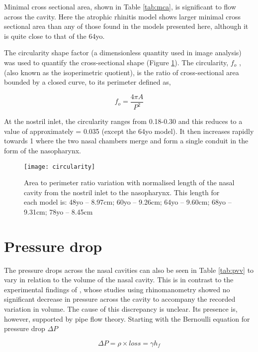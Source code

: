 Minimal cross sectional area, shown in Table \ref{tab:mca}, is significant to flow across the cavity\cite{Lindemann2008}. Here the atrophic rhinitis model shows larger minimal cross sectional area than any of those found in the models presented here, although it is quite close to that of the 64yo.

The circularity shape factor (a dimensionless quantity used in image analysis) was used to quantify the cross-sectional shape (Figure \ref{fig:Circ}). The circularity, $f_o$ , (also known as the isoperimetric quotient), is the ratio of cross-sectional area bounded by a closed curve, to its perimeter defined as, 

\begin{equation}
f_o = \frac{4 \pi A}{P^2}
\end{equation}

At the nostril inlet, the circularity ranges from 0.18-0.30 and this reduces to a value of approximately = 0.035 (except the 64yo model). It then increases rapidly towards 1 where the two nasal chambers merge and form a single conduit in the form of the nasopharynx.







\begin{figure}
\centering
\texttt{[image: circularity]}
\caption{Area to perimeter ratio variation with normalised length of the nasal cavity from the nostril inlet to the nasopharynx. This length for each model is: 48yo – 8.97cm; 60yo – 9.26cm; 64yo – 9.60cm; 68yo – 9.31cm; 78yo – 8.45cm}
\label{fig:Circ}
\end{figure}

\section{Pressure drop}

The pressure drops across the nasal cavities can also be seen in Table \ref{tab:pvv} to vary in relation to the volume of the nasal cavity. This is in contrast to the experimental findings of \cite{Lindemann2008, Edelstein1996, WhanKim2007}, whose studies using rhinomanometry showed no significant decrease in pressure across the cavity to accompany the recorded variation in volume. The cause of this discrepancy is unclear. Its presence is, however, supported by pipe flow theory.
Starting with the Bernoulli equation for pressure drop $\Delta P$ 

\begin{equation}
  \Delta P = \rho \times loss = \gamma h_f
\end{equation}

